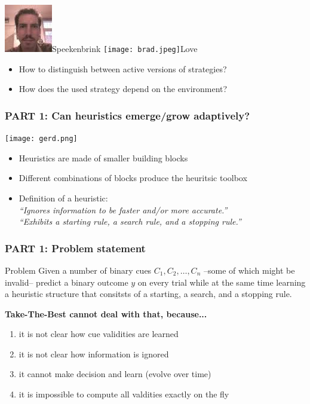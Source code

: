 \documentclass{beamer}
\begin{document}
\begin{frame}
\begin{enumerate}
\begin{center}
\includegraphics[scale=0.2]{maarten2.jpg}Speekenbrink\hspace{0.2cm}
\texttt{[image: brad.jpeg]}Love
\end{center}
\begin{itemize}
\item How to distinguish between active versions of strategies?
\item How does the used strategy depend on the environment?
\end{itemize}
\end{enumerate}
\end{frame}

\begin{frame}
 \frametitle{PART 1: Can heuristics emerge/grow adaptively?}
\vspace{-1cm}
\begin{center}
\texttt{[image: gerd.png]}
\end{center}
\begin{itemize}
\vspace{-0.5cm}
\item Heuristics are made of smaller building blocks
\item Different combinations of blocks produce the heuritsic toolbox 
\item Definition of a heuristic:\medskip\\
\emph{``Ignores information to be faster and/or more accurate.''}\medskip\\
\emph{``Exhibits a starting rule, a search rule, and a stopping rule.''}
\end{itemize}
\end{frame}

\begin{frame}
 \frametitle{PART 1: Problem statement}
\begin{block}{Problem}
Given a number of binary cues $C_1, C_2, \dots, C_n$ --some of which might be invalid-- predict a binary outcome $y$ on every trial while at the same time learning a heuristic structure that consitsts of a starting, a search, and a stopping rule.
\end{block}
\textbf{Take-The-Best cannot deal with that, because...}
\begin{enumerate}
\item it is not clear how cue validities are learned
\item it is not clear how information is ignored
\item it cannot make decision and learn (evolve over time)
\item it is impossible to compute all valdities exactly on the fly
\end{enumerate}
\end{frame}
\end{document}
